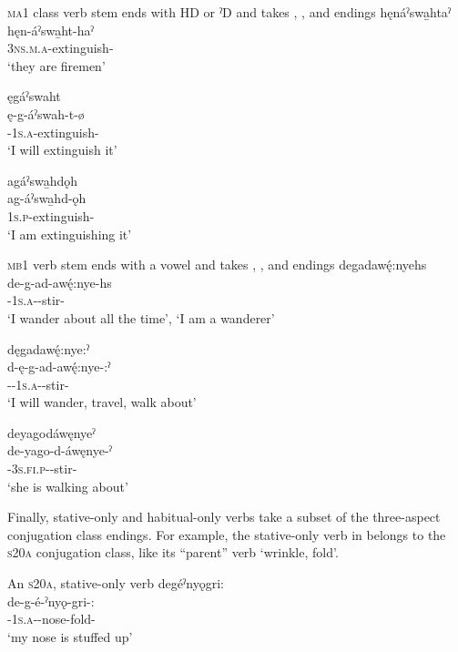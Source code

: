 \ea\label{ex:aspclass4} \textsc{ma1} class verb stem ends with HD or ˀD and takes  {\habitual},  {\zeropunctual}, and  {\stative} endings
\ea hęnáˀswa̱htaˀ\\
\gll hęn-áˀswa̱ht-haˀ\\
 \textsc{3ns.m.a}-extinguish-{\habitual}\\
\glt `they are firemen'

\ex ęgáˀswaht\\
\gll ę-g-áˀswah-t-ø\\
 \fut-\textsc{1s.a}-extinguish-{\zeropunctual}\\
\glt `I will extinguish it'

\ex agáˀswa̱hdǫh\\
\gll ag-áˀswa̱hd-ǫh\\
 \textsc{1s.p}-extinguish-{\stative}\\
\glt `I am extinguishing it'
\z
\z


\ea\label{ex:aspclass5} \textsc{mb1} verb stem ends with a vowel and takes  {\habitual},  {\punctual}, and  {\stative} endings
\ea degadawę́:nyehs\\
\gll de-g-ad-awę́:nye-hs\\
 {\dualic}-\textsc{1s.a}-{\semireflexive}-stir-{\habitual}\\
\glt ‘I wander about all the time’, `I am a wanderer'

\ex dęgadawę́:nye:ˀ\\
\gll d-ę-g-ad-awę́:nye-:ˀ\\
 {\dualic}-{\future}-\textsc{1s.a}-{\semireflexive}-stir-{\punctual}\\
\glt `I will wander, travel, walk about'

\ex deyagodáwęnyeˀ\\
\gll de-yago-d-áwęnye-ˀ\\
 {\dualic}-\textsc{3s.fi.p}-{\semireflexive}-stir-{\stative}\\
\glt `she is walking about'
\z
\z

Finally, stative-only and habitual-only verbs take a subset of the three-aspect conjugation class endings. For example, the stative-only verb in  belongs to the \textsc{s20a} conjugation class, like its “parent” verb  ‘wrinkle, fold’.

\ea\label{ex:aspclass6} An \textsc{s20a}, stative-only verb
\ea degéˀnyǫgri:\\
\gll de-g-é-ˀnyǫ-gri-:\\
 {\dualic}-\textsc{1s.a}-{\joinerE}-nose-fold-{\stative}\\
\glt `my nose is stuffed up'

